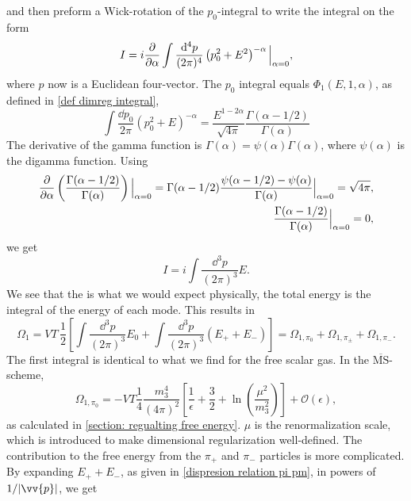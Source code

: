 and then preform a Wick-rotation of the $p_0$-integral to write the integral on the form
\begin{equation}
    I = i \pdv{\alpha} \int \frac{\dd^4 p}{(2 \pi)^4} \left(p_0^2 + E^2\right)^{-\alpha} \Big|_{\alpha=0},
\end{equation}
where $p$ now is a Euclidean four-vector.
The $p_0$ integral equals $\Phi_1(E, 1, \alpha)$, as defined in \autoref{def dimreg integral}, 
\begin{equation}
    \int \frac{\dd p_0}{2 \pi} (p_0^2 + E)^{-\alpha} = \frac{E^{1-2\alpha}}{\sqrt{4 \pi}} \frac{\Gamma(\alpha-1/2)}{\Gamma(\alpha)}
\end{equation}
The derivative of the gamma function is $\Gamma(\alpha) = \psi(\alpha)\Gamma(\alpha)$, where $\psi(\alpha)$ is the digamma function.
Using
\begin{align}
    \diffp{}{\alpha} \left(\frac{\Gamma(\alpha - 1/2) }{\Gamma(\alpha)}\right) \Big|_{\alpha=0}
    = \Gamma(\alpha - 1 / 2) \frac{\psi(\alpha - 1/2) - \psi(\alpha)}{\Gamma(\alpha)} \Big|_{\alpha=0}
    = \sqrt{4 \pi}, \\
    \frac{\Gamma(\alpha - 1/2) }{\Gamma(\alpha)}\Big|_{\alpha=0} = 0,
\end{align}
we get
\begin{equation}
    I = i \int \frac{\dd^3 p}{(2 \pi)^3} E.
\end{equation}
We see that the is what we would expect physically, the total energy is the integral of the energy of each mode.
This results in 
\begin{equation}
    \Omega_1 = 
    V T \, \frac{1}{2} 
    \left[\int \frac{\dd^3 p}{(2\pi)^3} E_0 + \int  \frac{\dd^3 p}{(2\pi)^3} (E_+ + E_-)\right]
    = \Omega_{1, \pi_0} + \Omega_{1, \pi_\pm} + \Omega_{1, \pi_-}.
\end{equation}
The first integral is identical to what we find for the free scalar gas.
In the $\overline{\mathrm{MS}}$-scheme,
\begin{equation}
    \Omega_{1, \pi_0} 
    = 
    - VT \frac{1}{4} \frac{m_3^4}{(4\pi)^2} 
    \left[ \frac{1}{\epsilon} + \frac{3}{2} + \ln(\frac{\mu^2}{m_3^2}) \right] + \mathcal{O}(\epsilon),
\end{equation}
as calculated in \autoref{section: regualting free energy}.
$\mu$ is the renormalization scale, which is introduced to make dimensional regularization well-defined.
The contribution to the free energy from the $\pi_+$ and $\pi_-$ particles is more complicated.
By expanding $E_+ + E_-$, as given in \autoref{dispresion relation pi pm}, in powers of $1 / \abs{\vv{p}}$, we get 
